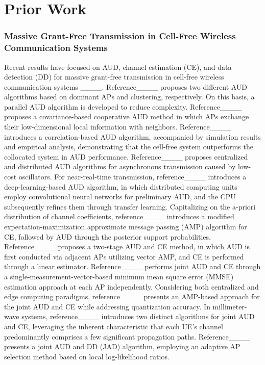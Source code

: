 \section{Prior Work}
\subsubsection{Massive Grant-Free Transmission in Cell-Free Wireless Communication Systems}
Recent results have focused on AUD, channel estimation (CE), and data detection (DD) for massive grant-free transmission in cell-free wireless communication systems ____.
%
Reference____ proposes two different AUD algorithms based on dominant APs and clustering, respectively. On this basis, a parallel AUD algorithm is developed to reduce complexity.
%
Reference____ proposes a covariance-based cooperative AUD method in which APs exchange their low-dimensional local information with neighbors.
%
Reference____ introduces a correlation-based AUD algorithm, accompanied by simulation results and empirical analysis, demonstrating that the cell-free system outperforms the collocated system in AUD performance.
%
Reference____ proposes centralized and distributed AUD algorithms for asynchronous transmission caused by low-cost oscillators.
%
For near-real-time transmission, reference____ introduces a deep-learning-based AUD algorithm, in which distributed computing units employ convolutional neural networks for preliminary AUD, and the CPU subsequently refines them through transfer learning.
%
Capitalizing on the a-priori distribution of channel coefficients, reference____ introduces a modified expectation-maximization approximate message passing (AMP) algorithm for CE, followed by AUD through the posterior support probabilities.
%
Reference____ proposes a two-stage AUD and CE method, in which AUD is first conducted via adjacent APs utilizing vector AMP, and CE is performed through a linear estimator.
%
Reference____ performs joint AUD and CE through a single-measurement-vector-based minimum mean square error (MMSE) estimation approach at each AP independently.
%
Considering both centralized and edge computing paradigms, reference____ presents an AMP-based approach for the joint AUD and CE while addressing quantization accuracy.
%
In millimeter-wave systems, reference____ introduces two distinct algorithms for joint AUD and CE, leveraging the inherent characteristic that each UE's channel predominantly comprises a few significant propagation paths.
%
Reference____ presents a joint AUD and DD (JAD) algorithm, employing an adaptive AP selection method based on local log-likelihood ratios.
